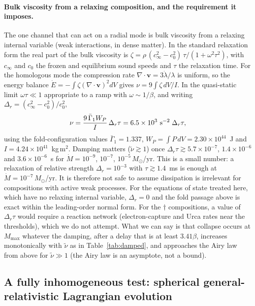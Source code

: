 \documentclass[11pt]{article}
\begin{document}
\paragraph{Bulk viscosity from a relaxing composition, and the requirement it imposes.} The one channel that can act on a radial mode is bulk viscosity from a relaxing internal variable (weak interactions, in dense matter). In the standard relaxation form \citep[][\S81]{LandauLifshitzFM} the real part of the bulk viscosity is $\zeta=\rho\,(c_\infty^2-c_0^2)\,\tau/(1+\omega^2\tau^2)$, with $c_\infty$ and $c_0$ the frozen and equilibrium sound speeds and $\tau$ the relaxation time. For the homologous mode the compression rate $\nabla\!\cdot\!\mathbf v=3\dot\lambda/\lambda$ is uniform, so the energy balance $\dot E=-\int\zeta(\nabla\!\cdot\!\mathbf v)^2dV$ gives $\nu=9\int\zeta\,dV/I$. In the quasi-static limit $\omega\tau\ll1$ appropriate to a ramp with $\omega\sim1/\beta$, and writing $\Delta_r=(c_\infty^2-c_0^2)/c_0^2$,
\begin{equation}
\nu=\frac{9\,\bar\Gamma_1W_P}{I}\,\Delta_r\tau=6.5\times10^{3}\ {\rm s^{-2}}\;\Delta_r\tau,
\end{equation}
using the fold-configuration values $\bar\Gamma_1=1.337$, $W_P=\int P\,dV=2.30\times10^{44}$~J and $I=4.24\times10^{41}$~kg\,m$^2$. Damping matters ($\tilde\nu\gtrsim1$) once $\Delta_r\tau\gtrsim5.7\times10^{-7}$, $1.4\times10^{-6}$ and $3.6\times10^{-6}$~s for $\dot M=10^{-9}$, $10^{-7}$, $10^{-5}\,M_\odot$/yr. This is a small number: a relaxation of relative strength $\Delta_r=10^{-3}$ with $\tau\gtrsim1.4$~ms is enough at $\dot M=10^{-7}\,M_\odot$/yr. It is therefore not safe to assume dissipation is irrelevant for compositions with active weak processes. For the equations of state treated here, which have no relaxing internal variable, $\Delta_r=0$ and the fold passage above is exact within the leading-order normal form. For the $\dagger$ compositions, a value of $\Delta_r\tau$ would require a reaction network (electron-capture and Urca rates near the thresholds), which we do not attempt. What we can say is that collapse occurs at $M_{\max}$ whatever the damping, after a delay that is at least $3.41\beta$, increases monotonically with $\tilde\nu$ as in Table~\ref{tab:damped}, and approaches the Airy law from above for $\tilde\nu\gg1$ (the Airy law is an asymptote, not a bound).

\subsection{A fully inhomogeneous test: spherical general-relativistic Lagrangian evolution}
\label{sec:lagrangian}
\end{document}
